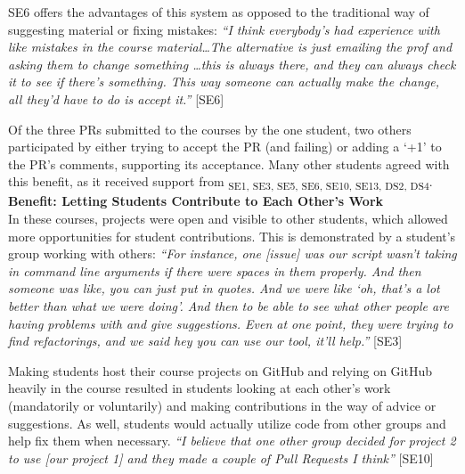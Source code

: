 SE6 offers the advantages of this system as opposed to the traditional way of suggesting material or fixing mistakes: \textit{``I think everybody's had experience with like mistakes in the course material\ldots The alternative is just emailing the prof and asking them to change something \ldots this is always there, and they can always check it to see if there's something. This way someone can actually make the change, all they'd have to do is accept it.''} [SE6]

Of the three PRs submitted to the courses by the one student, two others participated by either trying to accept the PR (and failing) or adding a `+1' to the PR's comments, supporting its acceptance. Many other students agreed with this benefit, as it received support from \textsubscript{SE1, SE3, SE5, SE6, SE10, SE13, DS2, DS4}. \\ %


\textbf{Benefit: Letting Students Contribute to Each Other's Work} \\
In these courses, projects were open and visible to other students, which allowed more opportunities for student contributions. This is demonstrated by a student's group working with others:
\textit{``For instance, one [issue] was our script wasn't taking in command line arguments if there were spaces in them properly. And then someone was like, you can just put in quotes. And we were like `oh, that's a lot better than what we were doing'. And then to be able to see what other people are having problems with and give suggestions. Even at one point, they were trying to find refactorings, and we said hey you can use our tool, it'll help.''} [SE3]

Making students host their course projects on GitHub and relying on GitHub heavily in the course resulted in students looking at each other's work (mandatorily or voluntarily) and making contributions in the way of advice or suggestions. As well, students would actually utilize code from other groups and help fix them when necessary. \textit{``I believe that one other group decided for project 2 to use [our project 1] and they made a couple of Pull Requests I think''} [SE10]

